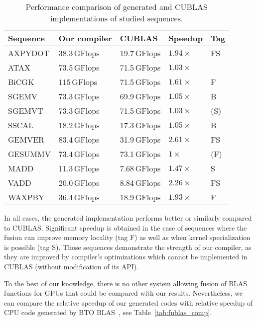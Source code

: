 \documentclass[final]{siamltex}
\begin{document}
{\begin{table}
        \centering
	\small
        \begin{tabular}{|l|l|l|l|l|}
                \hline
                Sequence & Our compiler & CUBLAS & Speedup & Tag \\
		\hline
                AXPYDOT & 38.3\,GFlops & 19.7\,GFlops & $1.94\times$ & FS \\
                ATAX & 73.5\,GFlops & 71.5\,GFlops & $1.03\times$ &  \\
                BiCGK & 115\,GFlops & 71.5\,GFlops & $1.61\times$ & F \\
                SGEMV & 73.3\,GFlops & 69.9\,GFlops & $1.05\times$ & B \\
                SGEMVT & 73.3\,GFlops & 71.5\,GFlops & $1.03\times$ & (S) \\
                SSCAL & 18.2\,GFlops & 17.3\,GFlops & $1.05\times$ & B \\
                GEMVER & 83.4\,GFlops & 31.9\,GFlops & $2.61\times$ & FS \\
                GESUMMV & 73.4\,GFlops & 73.1\,GFlops & $1\times$ & (F) \\
                MADD & 11.3\,GFlops & 7.68\,GFlops & $1.47\times$ & S \\
                VADD & 20.0\,GFlops & 8.84\,GFlops & $2.26\times$ & FS \\
                WAXPBY & 36.4\,GFlops & 18.9\,GFlops & $1.93\times$ & F\\
                \hline
        \end{tabular}
        \caption{Performance comparison of generated and CUBLAS implementations of studied sequences.}
        \label{tab:perf}
\end{table}

In all cases, the generated implementation performs better or similarly compared to CUBLAS. Significant speedup is obtained in the case of sequences where the fusion can improve memory locality (tag F) as well as when kernel specialization is possible (tag S). Those sequences demonstrate the strength of our compiler, as they are improved by compiler's optimizations which cannot be implemented in CUBLAS (without modification of its API). 









To the best of our knowledge, there is no other system allowing  fusion of BLAS functions for GPUs that could be compared with our results. Nevertheless, we can compare the relative speedup of our generated codes with relative speedup of CPU code generated by BTO BLAS~\cite{belter2009automating}, see Table~\ref{tab:fublas_comp}.

}
\end{document}
